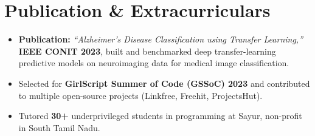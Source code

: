 \documentclass[letterpaper,10pt]{article}
\begin{document}
\section{Publication \& Extracurriculars}
\begin{itemize}[leftmargin=0.18in, itemsep=0pt, topsep=1pt]
  \item\small \textbf{Publication:} \textit{``Alzheimer's Disease Classification using Transfer Learning,''} \textbf{IEEE CONIT 2023}, built and benchmarked deep transfer-learning predictive models on neuroimaging data for medical image classification.
  \item\small Selected for \textbf{GirlScript Summer of Code (GSSoC) 2023} and contributed to multiple open-source projects (Linkfree, Freehit, ProjectsHut).
  \item\small Tutored \textbf{30+} underprivileged students in programming at Sayur, non-profit in South Tamil Nadu.
\end{itemize}
\vspace{-6pt}
\end{document}
